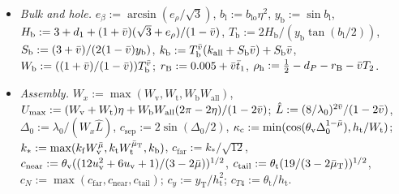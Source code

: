 \begin{definition}
{\begin{itemize}
$\rho_{\mathrm T}:=z_{\mathrm T}(1+(y_{\mathrm T}\eta^{1-\muTb}/h_{\mathrm t})^2)^{1/2}$;
$W_{\mathrm t}:=\sa_{\max}[(1+\vbar+\vbar\bar Y_2)^2+((1+\vbar)\bar Y_2+\vbar)^2]^{1/2}/(1-\vbar^2)$;
$S_3:=(y_{\mathrm T}/h_{\mathrm t}+\theta_{\mathrm t})(\rho_{\mathrm T}\sa_{\max}L_C+1+\vbar)/((1-\vbar^2)h_{\mathrm t})$,
$k_{\mathrm t}:=T_{\mathrm t}(1+\vk_{\mathrm w}+S_1\vbar)+S_3\vbar$; $\xi_2:=1/(3(1-\vbar)\sA_{\min})$;
$h_{\mathrm a}:=1-\sA_{\max}/2-\sr_{\max}b_{\mathrm{hi}}^2\epsbar^3/32$, $Q_{\mathrm a}:=(1+\vbar)\sr_{\max}/h_{\mathrm a}$,
$\tau_{\mathrm a}:=\beta_2Q_{\mathrm a}^{1+\mub}\epsbar^{1-\mub}/4$.
\item \emph{Bulk and hole.} $e_\beta:=\arcsin(e_\rho/\sqrt3)$, $b_{\mathrm l}:=b_{\mathrm{lo}}\eta^2$, $y_{\mathrm b}:=\sin b_{\mathrm l}$,
$H_{\mathrm b}:=3+d_1+(1+\bar v)(\sqrt3+e_\rho)/(1-\bar v)$, $T_{\mathrm b}:=2H_{\mathrm b}/(y_{\mathrm b}\tan(b_{\mathrm l}/2))$,
$S_{\mathrm b}:=(3+\bar v)/(2(1-\bar v)y_{\mathrm b})$, $k_{\mathrm b}:=T_{\mathrm b}^{\bar v}(k_{\mathrm{all}}+S_{\mathrm b}\bar v)+S_{\mathrm b}\bar v$,
$W_{\mathrm b}:=((1+\bar v)/(1-\bar v))T_{\mathrm b}^{\bar v}$; $r_{\mathrm B}:=0.005+\bar v\bar t_1$,
$\rho_{\mathrm h}:=\frac12-d_P-r_{\mathrm B}-\bar v T_2$.
\item \emph{Assembly.} $W_x:=\max(W_{\mathrm v},W_{\mathrm t},W_{\mathrm b}W_{\mathrm{all}})$,
$U_{\max}:=(W_{\mathrm v}+W_{\mathrm t})\eta+W_{\mathrm b}W_{\mathrm{all}}(2\pi-2\eta)/(1-2\bar v)$;
$\hat L:=(8/\lambda_0)^{2\bar v}/(1-2\bar v)$, $\Delta_0:=\lambda_0/(W_x\hat L)$, $c_{\mathrm{sep}}:=2\sin(\Delta_0/2)$,
$\kappa_{\mathrm c}:=\min(\cos(\theta_{\mathrm v}\Delta_0^{1-\bar\mu}),h_{\mathrm t}/W_{\mathrm t})$;
$k_*:=\max(k_{\mathrm f}W_{\mathrm v}^{\bar\mu},k_{\mathrm t}W_{\mathrm t}^{\bar\mu_{\mathrm T}},k_{\mathrm b})$, $c_{\mathrm{far}}:=k_*/\sqrt{12}$,
$c_{\mathrm{near}}:=\theta_{\mathrm v}((12u_{\mathrm v}^2+6u_{\mathrm v}+1)/(3-2\bar\mu))^{1/2}$,
$c_{\mathrm{tail}}:=\theta_{\mathrm t}(19/(3-2\bar\mu_{\mathrm T}))^{1/2}$, $c_N:=\max(c_{\mathrm{far}},c_{\mathrm{near}},c_{\mathrm{tail}})$;
$c_y:=y_{\mathrm T}/h_{\mathrm t}^2$; $c_{T4}:=\theta_{\mathrm t}/h_{\mathrm t}$.
\end{itemize}}
\end{definition}

